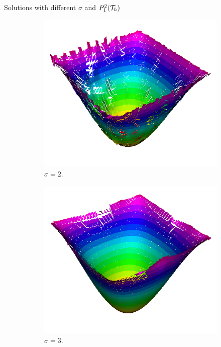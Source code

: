 \begin{frame}{Solutions with different $\sigma$ and $\relax{P}_1^2(\mathcal{T}_h)$}
\begin{figure}[h!]
\begin{subfigure}[b]{0.27\textwidth}
				\includegraphics[scale=0.18]{img/Difusion/Recortes/steady_diffusion_approx_sigma_2.png}
				\caption{\scriptsize $\sigma=2$.}
			\end{subfigure}
			\begin{subfigure}[b]{0.27\textwidth}
				\centering
				\includegraphics[scale=0.18]{img/Difusion/Recortes/steady_diffusion_approx_sigma_3.png}
				\caption{\scriptsize $\sigma=3$.}
			\end{subfigure}
			\begin{subfigure}[b]{0.27\textwidth}
				\centering

\end{subfigure}
\end{figure}
\end{frame}
